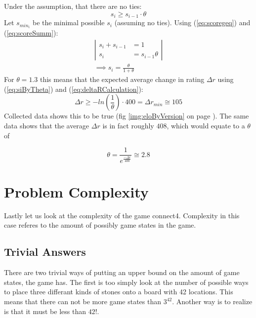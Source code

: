 \documentclass[12pt]{article}
\newcommand{\imgRef}[1]{(fig \ref{#1} on page \pageref{#1})}
\newcommand{\quckeq}[1]{(\ref{#1})}
\newcommand{\quickeq}[1]{\quckeq{#1}}
\newcommand{\FittedEloRaiting}{408}
\newcommand{\FittedScoringThreshold}{2.8}
\begin{document}
Under the assumption, that there are no ties:
\begin{equation}\label{eq:scoregeq}
s_i \geqslant s_{i-1} \cdot \theta
\end{equation}
Let \(s_{min_i}\) be the minimal possible \(s_i\) (assuming no ties). Using \quickeq{eq:scoregeq} and \quickeq{eq:scoreSumm}:
\begin{align}
\left|\begin{aligned}
s_i + s_{i-1} &= 1\\
s_i                 &= s_{i-1}\theta
\end{aligned}\right|\\
\implies s_i = \frac{\theta}{1+\theta}\label{eq:siByTheta}
\end{align}
For \(\theta = 1.3\) this means that the expected average change in rating \(\Delta r\) using \quickeq{eq:siByTheta} and \quickeq{eq:deltaRCalculation}:
\begin{equation}
\Delta r \geqslant -ln\left(\frac{1}{\theta}\right)\cdot 400 = \Delta r_{min} \cong 105
\end{equation}
Collected data shows this to be true \imgRef{img:eloByVersion}. The same data shows that the average \(\Delta r \) is in fact roughly \(\FittedEloRaiting\), which would equate to a \(\theta\) of

\begin{equation}
\theta = \frac{1}{e^{\frac{-\Delta r}{400}}} \cong \FittedScoringThreshold
\end{equation}
\begin{center}
	
	\captionsetup{width=.8\linewidth}
	\label{img:eloByVersion}
\end{center}
\section{Problem Complexity}
Lastly let us look at the complexity of the game connect4. Complexity in this case referes to the amount of possibly game states in the game.
\subsection{Trivial Answers}
There are two trivial ways of putting an upper bound on the amount of game states, the game has. The first is too simply look at the number of possible ways to place three differant kinds of stones onto a board with 42 locations. This means that there can not be more game states than \(3^{42}\). Another way is to realize is that it must be less than \(42!\).
\end{document}

